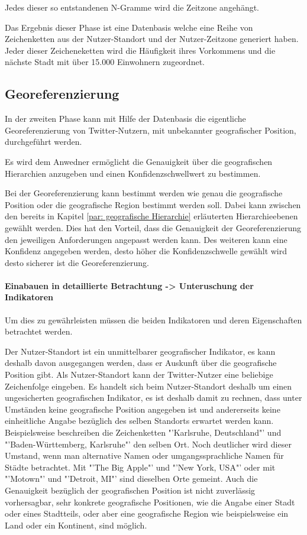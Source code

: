   	Jedes dieser so entstandenen N-Gramme wird die Zeitzone angehängt.  

	 

	Das Ergebnis dieser Phase ist eine Datenbasis welche eine Reihe von Zeichenketten aus der Nutzer-Standort und der Nutzer-Zeitzone generiert haben. 
	Jeder dieser Zeicheneketten wird die Häufigkeit ihres Vorkommens und die nächste Stadt mit über 15.000 Einwohnern zugeordnet. 


	\subsection{Georeferenzierung}  

	In der zweiten Phase kann mit Hilfe der Datenbasis die eigentliche Georeferenzierung von Twitter-Nutzern, mit unbekannter geografischer Position, durchgeführt werden. 

	Es wird dem Anwedner ermöglicht die Genauigkeit über die geografischen Hierarchien anzugeben und einen Konfidenzschwellwert zu bestimmen.


	Bei der Georeferenzierung kann bestimmt werden wie genau die geografische Position oder die geografische Region bestimmt werden soll. 
	Dabei kann zwischen den bereits in Kapitel \ref{par: geografische Hierarchie} erläuterten Hierarchieebenen gewählt werden.
	Dies hat den Vorteil, dass die Genauigkeit der Georeferenzierung den jeweiligen Anforderungen angepasst werden kann.
	Des weiteren kann eine Konfidenz angegeben werden, desto höher die Konfidenzschwelle gewählt wird desto sicherer ist die Georeferenzierung. 


	\paragraph{Einabauen in detaillierte Betrachtung -> Unteruschung der Indikatoren}

	Um dies zu gewährleisten müssen die beiden Indikatoren und deren Eigenschaften betrachtet werden.

	Der Nutzer-Standort ist ein unmittelbarer geografischer Indikator, es kann deshalb davon ausgegangen werden, dass er Auskunft über die geografische Position gibt.
	Als Nutzer-Standort kann der Twitter-Nutzer eine beliebige Zeichenfolge eingeben. 
	Es handelt sich beim Nutzer-Standort deshalb um einen ungesicherten geografischen Indikator, es ist deshalb damit zu rechnen, dass unter Umständen keine geografische Position angegeben ist und andererseits keine einheitliche Angabe bezüglich des selben Standorts erwartet werden kann.
	Beispielsweise beschreiben die Zeichenketten "'Karlsruhe, Deutschland"' und "'Baden-Württemberg, Karlsruhe"' den selben Ort.
	Noch deutlicher wird dieser Umstand, wenn man alternative Namen oder umgangssprachliche Namen für Städte betrachtet. 
	Mit "'The Big Apple"' und "'New York, USA"' oder mit "'Motown"' und "'Detroit, MI"' sind dieselben Orte gemeint.   
	Auch die Genauigkeit bezüglich der geografischen Position ist nicht zuverlässig vorhersagbar, sehr konkrete geografische Positionen, wie die Angabe einer Stadt oder eines Stadtteils, oder aber eine geografische Region wie beispielsweise ein Land oder ein Kontinent, sind möglich. 

